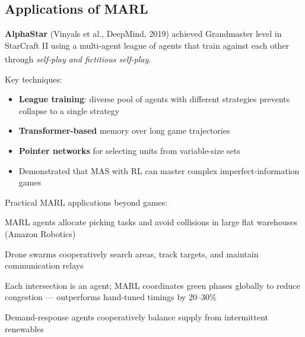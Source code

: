 \subsection{Applications of MARL}
\begin{tcbitemize}[ skin=sectionraster ]

    \tcbitem[title=StarCraft and AlphaStar, raster multicolumn=3]
    \textbf{AlphaStar} (Vinyals et al., DeepMind, 2019) achieved Grandmaster
    level in StarCraft II using a multi-agent league of agents that
    train against each other through \emph{self-play and fictitious
    self-play}.\textsuperscript{\cite[][Ch.~18]{weissMultiagentSystems2013}}

    Key techniques:
    \begin{itemize}
        \item \textbf{League training}: diverse pool of agents with different strategies
              prevents collapse to a single strategy
        \item \textbf{Transformer-based} memory over long game trajectories
        \item \textbf{Pointer networks} for selecting units from variable-size sets
        \item Demonstrated that MAS with RL can master complex imperfect-information games
    \end{itemize}

    \tcbitem[title={Multi-Robot Coordination \& Traffic}, raster multicolumn=3]
    Practical MARL applications beyond games:
    \begin{description}[leftmargin=0.6cm, labelindent=0pt]
        \item[\textbf{Warehouse robots}] MARL agents allocate picking tasks and
              avoid collisions in large flat warehouses (Amazon Robotics)
        \item[\textbf{Multi-UAV mission}] Drone swarms cooperatively search areas,
              track targets, and maintain communication relays
        \item[\textbf{Traffic signal control}] Each intersection is an agent;
              MARL coordinates green phases globally to reduce
              congestion --- outperforms hand-tuned timings by 20--30\%
        \item[\textbf{Energy grid}] Demand-response agents cooperatively balance
              supply from intermittent renewables
    \end{description}

\end{tcbitemize}

